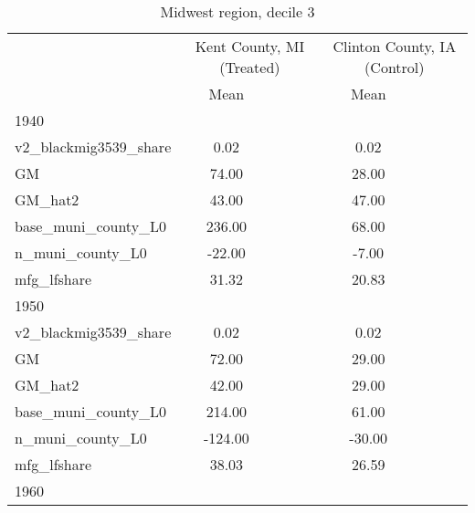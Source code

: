 \begin{table}[htbp]\centering
\def\sym#1{\ifmmode^{#1}\else\(^{#1}\)\fi}
\caption{Midwest region, decile 3 \label{tab1}}
\begin{tabular}{l*{2}{ccc}}
\toprule
                    &\multicolumn{3}{c}{Kent County, MI (Treated)}&\multicolumn{3}{c}{Clinton County, IA (Control)}\\
                    &        Mean&            &            &        Mean&            &            \\
\midrule
1940                &            &            &            &            &            &            \\
v2\_blackmig3539\_share&        0.02&            &            &        0.02&            &            \\
GM                  &       74.00&            &            &       28.00&            &            \\
GM\_hat2             &       43.00&            &            &       47.00&            &            \\
base\_muni\_county\_L0 &      236.00&            &            &       68.00&            &            \\
n\_muni\_county\_L0    &      -22.00&            &            &       -7.00&            &            \\
mfg\_lfshare         &       31.32&            &            &       20.83&            &            \\
\midrule
1950                &            &            &            &            &            &            \\
v2\_blackmig3539\_share&        0.02&            &            &        0.02&            &            \\
GM                  &       72.00&            &            &       29.00&            &            \\
GM\_hat2             &       42.00&            &            &       29.00&            &            \\
base\_muni\_county\_L0 &      214.00&            &            &       61.00&            &            \\
n\_muni\_county\_L0    &     -124.00&            &            &      -30.00&            &            \\
mfg\_lfshare         &       38.03&            &            &       26.59&            &            \\
\midrule
1960                &            &            &            &            &            &            \\

\end{tabular}
\end{table}
